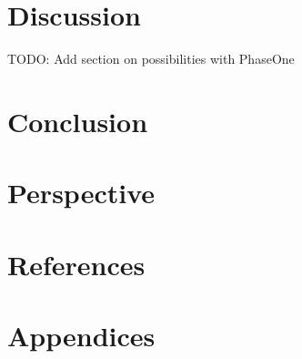 \documentclass[
]{article}
\begin{document}
\newpage{}

\hypertarget{discussion}{%
\section{Discussion}\label{discussion}}

TODO: Add section on possibilities with PhaseOne

\newpage{}

\hypertarget{conclusion}{%
\section{Conclusion}\label{conclusion}}

\newpage{}

\hypertarget{sec-perspective}{%
\section{Perspective}\label{sec-perspective}}

\newpage{}

\hypertarget{references}{%
\section{References}\label{references}}

\hypertarget{sec-appendices}{%
\section{Appendices}\label{sec-appendices}}
\end{document}
